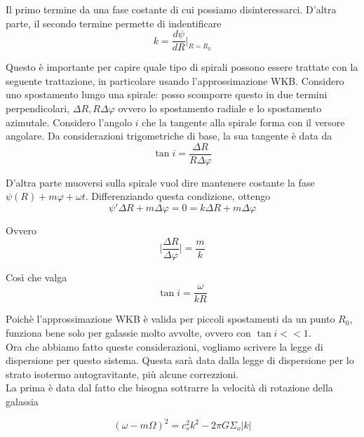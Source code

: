 \documentclass{report}
\begin{document}
Il primo termine da una fase costante di cui possiamo disinteressarci. D'altra parte, il secondo termine permette di indentificare 
\begin{equation}
    k = \frac{d\psi}{dR}\biggr|_{R=R_0}
\end{equation}

Questo è importante per capire quale tipo di spirali possono essere trattate con la seguente trattazione, in particolare usando l'approssimazione WKB. Considero uno spostamento lungo una spirale: posso scomporre questo in due termini perpendicolari, $\Delta R, R\Delta \varphi$ ovvero lo spostamento radiale e lo spostamento azimutale. Considero l'angolo $i$ che la tangente alla spirale forma con il versore angolare. Da considerazioni trigometriche di base, la sua tangente è data da 
\begin{equation}
    \tan i = \frac{\Delta R}{R \Delta \varphi}
\end{equation}

D'altra parte muoversi sulla spirale vuol dire mantenere costante la fase $\psi(R) + m\varphi + \omega t$. Differenziando questa condizione, ottengo 
\begin{equation}
    \psi' \Delta R + m\Delta \varphi = 0 = k\Delta R + m\Delta \varphi
\end{equation}

Ovvero 
\begin{equation}
    \biggr| \frac{\Delta R}{\Delta \varphi}\biggr| = \frac{m}{k}
\end{equation}

Così che valga 
\begin{equation}
    \tan i= \frac{\omega}{kR}
\end{equation}

Poichè l'approssimazione WKB è valida per piccoli spostamenti da un punto $R_0$, funziona bene solo per galassie molto avvolte, ovvero con $\tan i << 1$. \\

Ora che abbiamo fatto queste considerazioni, vogliamo scrivere la legge di dispersione per questo sistema. Questa sarà data dalla legge di dispersione per lo strato isotermo autogravitante, più alcune correzzioni. \\

La prima è data dal fatto che bisogna sottrarre la velocità di rotazione della galassia

\begin{equation}
    (\omega - m\Omega)^2 = c_s^2k^2 - 2\pi G \Sigma_o |k|
\end{equation}
\end{document}
